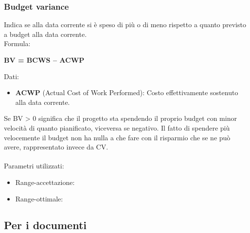 \documentclass[a4paper,11pt]{article}
\begin{document}
\subsubsection{Budget variance} Indica se alla data corrente si è speso di più o di meno rispetto a quanto previsto a budget alla data corrente.\\
Formula: 
\begin{center}
\textbf{BV = BCWS – ACWP}
\end{center}
Dati:
\begin{itemize}
\item \textbf{ACWP} (Actual Cost of Work Performed): Costo effettivamente sostenuto alla data corrente.
\end{itemize}
Se BV > 0 significa che il progetto sta spendendo il proprio budget con minor velocità di quanto pianificato, viceversa se negativo. Il fatto di spendere più velocemente il budget non ha nulla a che fare con il risparmio che se ne può avere, rappresentato invece da CV.\\\\
Parametri utilizzati: 
\begin{itemize}
	\item Range-accettazione: \begin{math}[ \ge -(PreventivoFase*10\%)]
	\end{math}
	\item Range-ottimale: \begin{math}[ \ge 0]\end{math}
	\end{itemize}
\subsection{Per i documenti}
\end{document}
